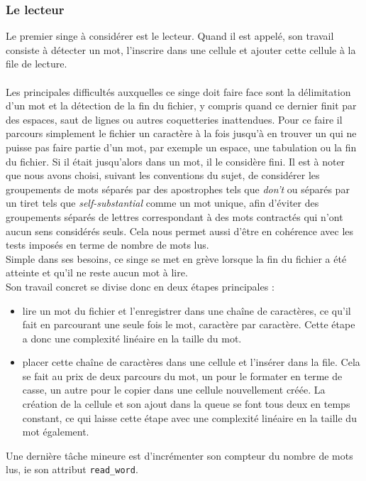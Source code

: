 \documentclass{article}
\begin{document}
\subsubsection{Le lecteur}
Le premier singe à considérer est le lecteur. Quand il est appelé, son travail consiste à détecter un mot, l'inscrire dans une cellule et ajouter cette cellule à la file de lecture.\\\\
Les principales difficultés auxquelles ce singe doit faire face sont la délimitation d'un mot et la détection de la fin du fichier, y compris quand ce dernier finit par des espaces, saut de lignes ou autres coquetteries inattendues. Pour ce faire il parcours simplement le fichier un caractère à la fois jusqu'à en trouver un qui ne puisse pas faire partie d'un mot, par exemple un espace, une tabulation ou la fin du fichier. Si il était jusqu'alors dans un mot, il le considère fini. Il est à noter que nous avons choisi, suivant les conventions du sujet, de considérer les groupements de mots séparés par des apostrophes tels que \emph{don't} ou séparés par un tiret tels que \emph{self-substantial} comme un mot unique, afin d'éviter des groupements séparés de lettres correspondant à des mots contractés qui n'ont aucun sens considérés seuls. Cela nous permet aussi d'être en cohérence avec les tests imposés en terme de nombre de mots lus.\\
Simple dans ses besoins, ce singe se met en grève lorsque la fin du fichier a été atteinte et qu'il ne reste aucun mot à lire.\\
Son travail concret se divise donc en deux étapes principales :
\begin{itemize}
    \item lire un mot du fichier et l'enregistrer dans une chaîne de caractères, ce qu'il fait en parcourant une seule fois le mot, caractère par caractère. Cette étape a donc une complexité linéaire en la taille du mot.
    \item placer cette chaîne de caractères dans une cellule et l'insérer dans la file. Cela se fait au prix de deux parcours du mot, un pour le formater en terme de casse, un autre pour le copier dans une cellule nouvellement créée. La création de la cellule et son ajout dans la queue se font tous deux en temps constant, ce qui laisse cette étape avec une complexité linéaire en la taille du mot également.
\end{itemize}
Une dernière tâche mineure est d'incrémenter son compteur du nombre de mots lus, ie son attribut \verb:read_word:.
\end{document}
